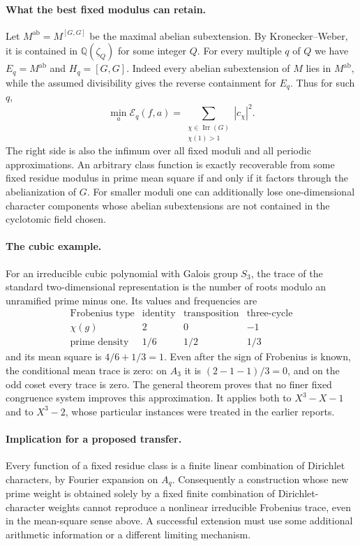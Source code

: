 \paragraph{What the best fixed modulus can retain.}
Let $M^{\mathrm{ab}}=M^{[G,G]}$ be the maximal abelian subextension.
By Kronecker--Weber, it is contained in $\mathbb Q(\zeta_Q)$ for some
integer $Q$. For every multiple $q$ of $Q$ we have
$E_q=M^{\mathrm{ab}}$ and $H_q=[G,G]$. Indeed every abelian subextension
of $M$ lies in $M^{\mathrm{ab}}$, while the assumed divisibility gives
the reverse containment for $E_q$. Thus for such $q$,
\begin{equation}\label{eq:all-fixed-periodic}
 \min_a\mathcal E_q(f,a)
   =\sum_{\substack{\chi\in\operatorname{Irr}(G)\\\chi(1)>1}}
       |c_\chi|^2.
\end{equation}
The right side is also the infimum over all fixed moduli and all periodic
approximations. An arbitrary class function is exactly recoverable from
some fixed residue modulus in prime mean square if and only if it factors
through the abelianization of $G$. For smaller moduli one can additionally
lose one-dimensional character components whose abelian subextensions
are not contained in the cyclotomic field chosen.

\paragraph{The cubic example.}
For an irreducible cubic polynomial with Galois group $S_3$, the trace of
the standard two-dimensional representation is the number of roots
modulo an unramified prime minus one. Its values and frequencies are
\[
\begin{array}{c|ccc}
\text{Frobenius type}&\text{identity}&\text{transposition}&\text{three-cycle}\\
\hline
\chi(g)&2&0&-1\\
\text{prime density}&1/6&1/2&1/3
\end{array}
\]
and its mean square is $4/6+1/3=1$. Even after the sign of Frobenius is
known, the conditional mean trace is zero: on $A_3$ it is
$(2-1-1)/3=0$, and on the odd coset every trace is zero. The general
theorem proves that no finer fixed congruence system improves this
approximation. It applies both to $X^3-X-1$ and to $X^3-2$, whose
particular instances were treated in the earlier reports.

\paragraph{Implication for a proposed transfer.}
Every function of a fixed residue class is a finite linear combination of
Dirichlet characters, by Fourier expansion on $A_q$. Consequently a
construction whose new prime weight is obtained solely by a fixed finite
combination of Dirichlet-character weights cannot reproduce a nonlinear
irreducible Frobenius trace, even in the mean-square sense above. A
successful extension must use some additional arithmetic information or
a different limiting mechanism.

